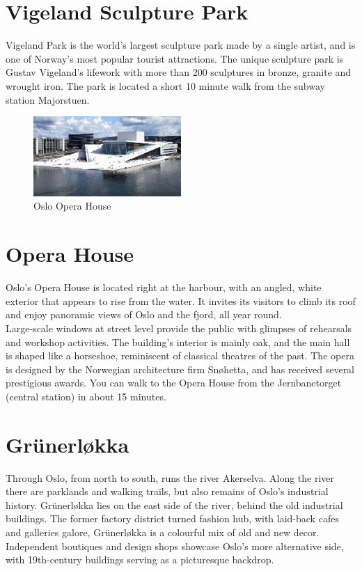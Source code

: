 \documentclass{article}
\begin{document}
\section*{Vigeland Sculpture Park}

Vigeland Park is the world's largest sculpture park made by a single artist, and is one of Norway's most popular tourist attractions. The unique sculpture park is Gustav Vigeland's lifework with more than 200 sculptures in bronze, granite and wrought iron. The park is located a short 10 minute walk from the subway station Majorstuen.

\begin{figure}
    \centering
    \includegraphics[width=0.5\textwidth]{img/operahouse.jpg}%
     \caption{Oslo Opera House }
\end{figure}

\vspace{1cm}

\section*{Opera House}
Oslo's Opera House is located right at the harbour, with an angled, white exterior that appears to rise from the water. It invites its visitors to climb its roof and enjoy panoramic views of Oslo and the fjord, all year round. \\
Large-scale windows at street level provide the public with glimpses of rehearsals and workshop activities. The building's interior is mainly oak, and the main hall is shaped like a horseshoe, reminiscent of classical theatres of the past. The opera is designed by the Norwegian architecture firm Snøhetta, and has received several prestigious awards. You can walk to the Opera House from the Jernbanetorget (central station) in about 15 minutes.

\clearpage

\section*{Gr\"unerløkka}
Through Oslo, from north to south, runs the river Akerselva. Along the river there are parklands and walking trails, but also remains of Oslo’s industrial history.
Gr\"unerløkka lies on the east side of the river, behind the old industrial buildings. The former factory district turned fashion hub, with laid-back cafes and galleries galore, Gr\"unerløkka is a colourful mix of old and new decor. Independent boutiques and design shops showcase Oslo’s more alternative side, with 19th-century buildings serving as a picturesque backdrop.
\end{document}
